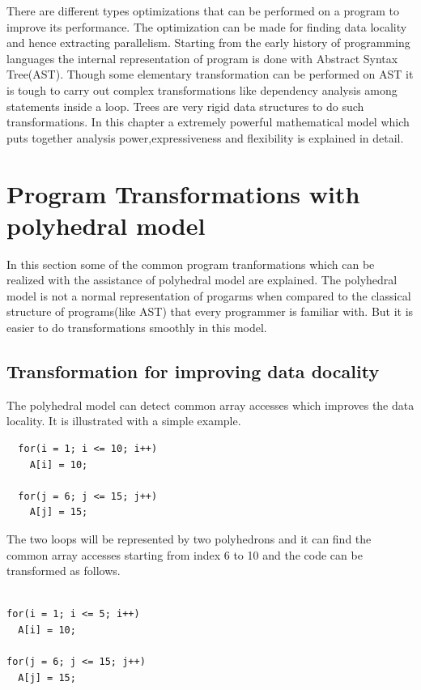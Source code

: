 \label{chap:background}

There are different types optimizations that can be performed on a program to improve its
performance. The optimization can be made for finding data locality and hence extracting
parallelism. Starting from the early history of programming languages the internal representation
of program is done with Abstract Syntax Tree(AST). Though some elementary transformation can
be performed on AST it is tough to carry out complex transformations like dependency analysis among
statements inside a loop. Trees are very rigid data structures to do such transformations.
In this chapter a extremely powerful mathematical model which puts together analysis power,expressiveness and flexibility is explained in detail.

\section{Program Transformations with polyhedral model}

In this section some of the common program tranformations which can be realized with the
assistance of polyhedral model are explained. The polyhedral model is not a normal representation of progarms when compared to the
classical structure of programs(like AST) that every programmer is familiar with. But
it is easier to do transformations smoothly in this model.

\subsection{Transformation for improving data docality}

The polyhedral model can detect common array accesses which improves the data locality. It is
illustrated with a simple example.
{\footnotesize
\begin{lstlisting}
  for(i = 1; i <= 10; i++)
    A[i] = 10;
  
  for(j = 6; j <= 15; j++)
    A[j] = 15;
\end{lstlisting}
}

The two loops will be represented by two polyhedrons and it can find the common 
array accesses starting from index 6 to 10 and the code can be transformed as follows.

{\footnotesize
\begin{lstlisting}

for(i = 1; i <= 5; i++)
  A[i] = 10;

for(j = 6; j <= 15; j++)
  A[j] = 15;
\end{lstlisting}
}

